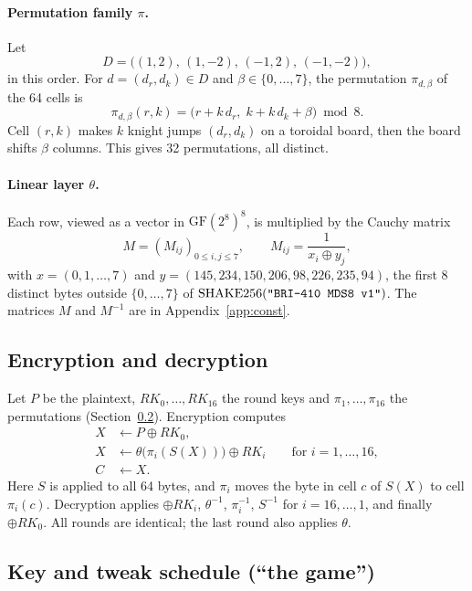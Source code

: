 \documentclass[11pt,a4paper]{article}
\newcommand{\GF}{\mathrm{GF}}
\newcommand{\RK}{\mathit{RK}}
\newcommand{\shake}{\mathrm{SHAKE256}}
\newcommand{\str}[1]{\text{\texttt{"#1"}}}
\begin{document}
\paragraph{Permutation family $\pi$.} Let
\[
  D = \bigl((1,2),\,(1,-2),\,(-1,2),\,(-1,-2)\bigr),
\]
in this order. For $d = (d_r, d_k) \in D$ and $\beta \in \{0,\dots,7\}$, the permutation $\pi_{d,\beta}$ of the
64 cells is
\[
  \pi_{d,\beta}(r,k) = \bigl(r + k\,d_r,\; k + k\,d_k + \beta\bigr) \bmod 8 .
\]
Cell $(r,k)$ makes $k$ knight jumps $(d_r,d_k)$ on a toroidal board, then the board shifts $\beta$ columns. This
gives 32 permutations, all distinct.

\paragraph{Linear layer $\theta$.} Each row, viewed as a vector in $\GF(2^8)^8$, is multiplied by the Cauchy
matrix
\[
  M = (M_{ij})_{0\le i,j\le 7}, \qquad M_{ij} = \frac{1}{x_i \oplus y_j},
\]
with $x = (0,1,\dots,7)$ and $y = (145, 234, 150, 206, 98, 226, 235, 94)$, the first 8 distinct bytes outside
$\{0,\dots,7\}$ of $\shake(\str{BRI-410 MDS8 v1})$. The matrices $M$ and $M^{-1}$ are in
Appendix~\ref{app:const}.

\subsection{Encryption and decryption}

Let $P$ be the plaintext, $\RK_0,\dots,\RK_{16}$ the round keys and $\pi_1,\dots,\pi_{16}$ the permutations
(Section~\ref{sec:schedule}). Encryption computes
\begin{align*}
  X &\gets P \oplus \RK_0, \\
  X &\gets \theta\bigl(\pi_i(S(X))\bigr) \oplus \RK_i \qquad \text{for } i = 1,\dots,16, \\
  C &\gets X .
\end{align*}
Here $S$ is applied to all 64 bytes, and $\pi_i$ moves the byte in cell $c$ of $S(X)$ to cell $\pi_i(c)$.
Decryption applies $\oplus\RK_i$, $\theta^{-1}$, $\pi_i^{-1}$, $S^{-1}$ for $i = 16,\dots,1$, and finally
$\oplus\RK_0$. All rounds are identical; the last round also applies $\theta$.

\subsection{Key and tweak schedule (``the game'')}\label{sec:schedule}
\end{document}
